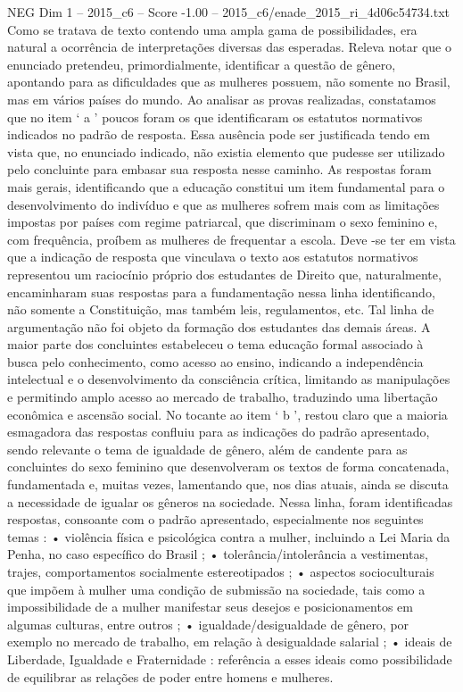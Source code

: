 \begin{textsample}{NEG Dim 1 – 2015\_c6 – Score -1.00 – 2015\_c6/enade\_2015\_ri\_4d06c54734.txt}
Como se tratava de texto contendo uma ampla gama de possibilidades, era natural a ocorrência de interpretações diversas das esperadas.
Releva notar que o enunciado pretendeu, primordialmente, identificar a questão de gênero, apontando para as dificuldades que as mulheres possuem, não somente no Brasil, mas em vários países do mundo.
Ao analisar as provas realizadas, constatamos que no item ‘ a ’ poucos foram os que identificaram os estatutos normativos indicados no padrão de resposta.
Essa ausência pode ser justificada tendo em vista que, no enunciado indicado, não existia elemento que pudesse ser utilizado pelo concluinte para embasar sua resposta nesse caminho.
As respostas foram mais gerais, identificando que a educação constitui um item fundamental para o desenvolvimento do indivíduo e que as mulheres sofrem mais com as limitações impostas por países com regime patriarcal, que discriminam o sexo feminino e, com frequência, proíbem as mulheres de frequentar a escola.
Deve -se ter em vista que a indicação de resposta que vinculava o texto aos estatutos normativos representou um raciocínio próprio dos estudantes de Direito que, naturalmente, encaminharam suas respostas para a fundamentação nessa linha identificando, não somente a Constituição, mas também leis, regulamentos, etc.
Tal linha de argumentação não foi objeto da formação dos estudantes das demais áreas.
A maior parte dos concluintes estabeleceu o tema educação formal associado à busca pelo conhecimento, como acesso ao ensino, indicando a independência intelectual e o desenvolvimento da consciência crítica, limitando as manipulações e permitindo amplo acesso ao mercado de trabalho, traduzindo uma libertação econômica e ascensão social.
No tocante ao item ‘ b ’, restou claro que a maioria esmagadora das respostas confluiu para as indicações do padrão apresentado, sendo relevante o tema de igualdade de gênero, além de candente para as concluintes do sexo feminino que desenvolveram os textos de forma concatenada, fundamentada e, muitas vezes, lamentando que, nos dias atuais, ainda se discuta a necessidade de igualar os gêneros na sociedade.
Nessa linha, foram identificadas respostas, consoante com o padrão apresentado, especialmente nos seguintes temas : • violência física e psicológica contra a mulher, incluindo a Lei Maria da Penha, no caso específico do Brasil ; • tolerância/intolerância a vestimentas, trajes, comportamentos socialmente estereotipados ; • aspectos socioculturais que impõem à mulher uma condição de submissão na sociedade, tais como a impossibilidade de a mulher manifestar seus desejos e posicionamentos em algumas culturas, entre outros ; • igualdade/desigualdade de gênero, por exemplo no mercado de trabalho, em relação à desigualdade salarial ; • ideais de Liberdade, Igualdade e Fraternidade : referência a esses ideais como possibilidade de equilibrar as relações de poder entre homens e mulheres.

\end{textsample}
